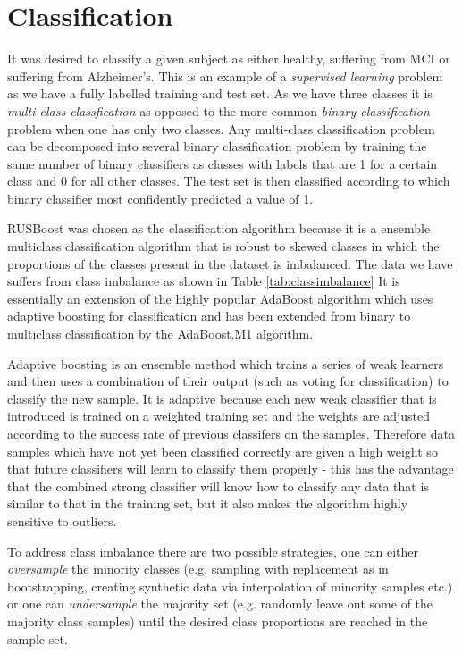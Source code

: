 \section{Classification}

It was desired to classify a given subject as either healthy, suffering from MCI or suffering from Alzheimer's. This is an example of a \textit{supervised learning} problem as we have a fully labelled training and test set. As we have three classes it is \textit{multi-class classfication} as opposed to the more common \textit{binary classification} problem when one has only two classes. Any multi-class classification problem can be decomposed into several binary classification problem by training the same number of binary classifiers as classes with labels that are 1 for a certain class and 0 for all other classes. The test set is then classified according to which binary classifier most confidently predicted a value of 1. \cite{Witten2011}

RUSBoost was chosen as the classification algorithm because it is a ensemble multiclass classification algorithm that is robust to skewed classes in which the proportions of the classes present in the dataset is imbalanced.\cite{Seifert2010} The data we have suffers from class imbalance as shown in Table \ref{tab:classimbalance} It is essentially an extension of the highly popular AdaBoost algorithm which uses adaptive boosting for classification and has been extended from binary to multiclass classification by the AdaBoost.M1 algorithm\cite{Witten2011}.

Adaptive boosting is an ensemble method which trains a series of weak learners and then uses a combination of their output (such as voting for classification) to classify the new sample. It is adaptive because each new weak classifier that is introduced is trained on a weighted training set and the weights are adjusted according to the success rate of previous classifers on the samples. Therefore data samples which have not yet been classified correctly are given a high weight so that future classifiers will learn to classify them properly - this has the advantage that the combined strong classifier will know how to classify any data that is similar to that in the training set, but it also makes the algorithm highly sensitive to outliers.\cite{Witten2011}

To address class imbalance there are two possible strategies, one can either \textit{oversample} the minority classes  (e.g. sampling with replacement as in bootstrapping, creating synthetic data via interpolation of minority samples etc.) or one can \textit{undersample} the majority set (e.g. randomly leave out some of the majority class samples) until the desired class proportions are reached in the sample set.

